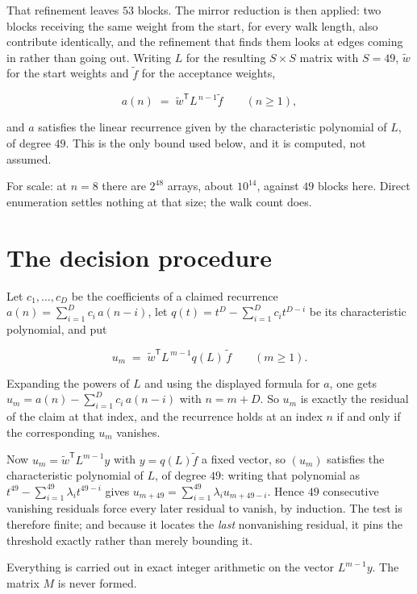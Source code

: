 \documentclass[11pt]{article}
\theoremstyle{definition}
\begin{document}
That refinement leaves $53$ blocks. The mirror reduction is then applied: two blocks receiving the same weight from the start, for every walk length, also contribute identically, and the refinement that finds them looks at edges coming in rather than going out. Writing $L$ for the resulting $S \times S$ matrix with $S = 49$, $\tilde w$ for the start weights and $\tilde f$ for the acceptance weights,

\[a(n) \;=\; \tilde w^{\mathsf T} L^{\,n-1} \tilde f \qquad (n \ge 1),\]

and $a$ satisfies the linear recurrence given by the characteristic polynomial of $L$, of degree $49$. This is the only bound used below, and it is computed, not assumed.

For scale: at $n = 8$ there are $2^{48}$ arrays, about $10^{14}$, against $49$ blocks here. Direct enumeration settles nothing at that size; the walk count does.

\section{The decision procedure}

Let $c_1,\dots,c_D$ be the coefficients of a claimed recurrence $a(n) = \sum_{i=1}^{D} c_i\,a(n-i)$, let $q(t) = t^{D} - \sum_{i=1}^{D} c_i t^{D-i}$ be its characteristic polynomial, and put

\[u_m \;=\; \tilde w^{\mathsf T} L^{\,m-1} q(L)\,\tilde f \qquad (m \ge 1).\]

Expanding the powers of $L$ and using the displayed formula for $a$, one gets $u_m = a(n) - \sum_{i=1}^{D} c_i\,a(n-i)$ with $n = m + D$. So $u_m$ is exactly the residual of the claim at that index, and the recurrence holds at an index $n$ if and only if the corresponding $u_m$ vanishes.

Now $u_m = \tilde w^{\mathsf T} L^{m-1} y$ with $y = q(L)\tilde f$ a fixed vector, so $(u_m)$ satisfies the characteristic polynomial of $L$, of degree $49$: writing that polynomial as $t^{49} - \sum_{i=1}^{49} \lambda_i t^{49-i}$ gives $u_{m+49} = \sum_{i=1}^{49} \lambda_i u_{m+49-i}$. Hence $49$ consecutive vanishing residuals force every later residual to vanish, by induction. The test is therefore finite; and because it locates the {\itshape last} nonvanishing residual, it pins the threshold exactly rather than merely bounding it.

Everything is carried out in exact integer arithmetic on the vector $L^{m-1}y$. The matrix $M$ is never formed.
\end{document}
